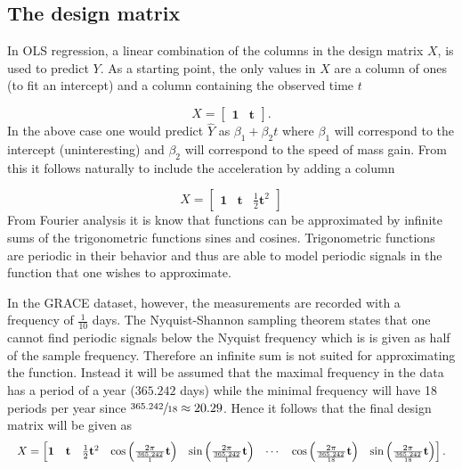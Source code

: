 \subsection{The design matrix}
In OLS regression, a linear combination of the columns in the design matrix $X$, is used to predict $Y$.
As a starting point, the only values in $X$ are a column of ones (to fit an intercept) and a column containing the observed time $t$

\begin{equation}
X = \left[\begin{matrix} \mathbf{1} & \mathbf{t} \end{matrix}\right].
\end{equation}
In the above case one would predict $\hat{Y}$ as $\beta_1 + \beta_2 t$ where $\beta_1$ will correspond to the intercept (uninteresting) and $\beta_2$ will correspond to the speed of mass gain.
From this it follows naturally to include the acceleration by adding a column

\begin{equation}
X = \left[\begin{matrix} \mathbf{1} & \mathbf{t} & \frac{1}{2} \mathbf{t}^2 \end{matrix}\right]
\end{equation} 
From Fourier analysis it is know that functions can be approximated by infinite sums of the trigonometric functions sines and cosines.
Trigonometric functions are periodic in their behavior and thus are able to model periodic signals in the function that one wishes to approximate.

In the GRACE dataset, however, the measurements are recorded with a frequency of $\frac{1}{10}$ days.
The Nyquist-Shannon sampling theorem states that one cannot find periodic signals below the Nyquist frequency which is is given as half of the sample frequency. 
Therefore an infinite sum is not suited for approximating the function. 
Instead it will be assumed that the maximal frequency in the data has a period of a year ($365.242$ days) while the minimal frequency will have 18 periods per year since  $\sfrac{365.242}{18} \approx 20.29$. Hence it follows that the final design matrix will be given as
\begin{equation*}
\resizebox{\textwidth}{!}{$
X = \left[\begin{matrix}
	\mathbf{1} &
	\mathbf{t} &
	\frac{1}{2} \mathbf{t}^2 &
	\cos\left( \frac{2 \pi}{\frac{365.242}{1}} \mathbf{t} \right) &
	\sin\left( \frac{2 \pi}{\frac{365.242}{1}} \mathbf{t} \right) &
	\cdots &
	\cos\left( \frac{2 \pi}{\frac{365.242}{18}} \mathbf{t} \right) &
	\sin\left( \frac{2 \pi}{\frac{365.242}{18}} \mathbf{t} \right)
\end{matrix}\right].
$}
\end{equation*}
